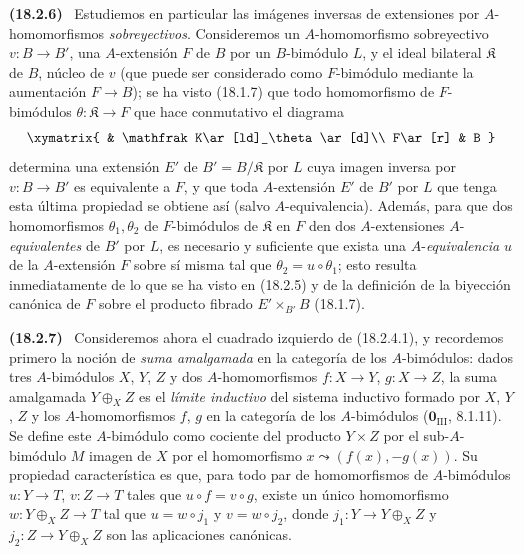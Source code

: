 \documentclass[10pt,oneside]{book}
\makeatletter
\newcommand{\setmanualcurrentlabel}[1]{\def\@currentlabel{#1}}
\newcommand{\oldpage}[2][]{%
  \setcounter{footnote}{0}%
  \marginpar{\scriptsize\textbf{#1}~|~#2}\ignorespaces}
\newenvironment{env}[1][]{\setmanualcurrentlabel{#1}\par\medskip\noindent\textbf{(#1)}\ }{\par}
\providecommand{\setmin}{-}%
\makeatother
\begin{document}
\begin{env}[18.2.6]
\label{0.18.2.6-es}
Estudiemos en particular las imágenes inversas de extensiones por
$A$-homomorfismos \emph{sobreyectivos}. Consideremos un $A$-homomorfismo
sobreyectivo $v:B\to B'$, una $A$-extensión $F$ de $B$ por un $B$-bimódulo $L$,
y el ideal bilateral $\mathfrak K$ de $B$, núcleo de $v$ (que puede ser
considerado como $F$-bimódulo mediante la aumentación $F\to B$); se ha visto
(18.1.7) que todo homomorfismo de $F$-bimódulos
$\theta:\mathfrak K\to F$ que hace conmutativo el diagrama
\[
  \xymatrix{
    & \mathfrak K\ar[ld]_\theta\ar[d]\\
    F\ar[r] & B
  }
\]
determina una extensión $E'$ de $B'=B/\mathfrak K$ por $L$ cuya imagen
inversa por $v:B\to B'$ es equivalente a $F$, y que toda $A$-extensión
$E'$ de $B'$ por $L$ que tenga esta última propiedad se obtiene así (salvo
$A$-equivalencia). Además, para que dos homomorfismos
$\theta_1,\theta_2$ de $F$-bimódulos de $\mathfrak K$ en $F$ den dos
  $A$-extensiones $A$-\emph{equivalentes} de $B'$ por $L$, es necesario y suficiente que
exista una $A$-\emph{equivalencia} $u$ de la $A$-extensión $F$ sobre sí misma tal que
\oldpage[0\textsubscript{IV-1}]{57}
$\theta_2=u\circ\theta_1$; esto resulta inmediatamente de lo que se ha visto en
(18.2.5) y de la definición de la biyección canónica de $F$ sobre el producto
fibrado $E'\times_{B'}B$ (18.1.7).
\end{env}

\begin{env}[18.2.7]
\label{0.18.2.7-es}
Consideremos ahora el cuadrado izquierdo de (18.2.4.1), y recordemos primero
la noción de \emph{suma amalgamada} en la categoría de los $A$-bimódulos:
dados tres $A$-bimódulos $X$, $Y$, $Z$ y dos $A$-homomorfismos
$f:X\to Y$, $g:X\to Z$, la suma amalgamada $Y\oplus_XZ$ es el \emph{límite
inductivo} del sistema inductivo formado por $X$, $Y$, $Z$ y los
$A$-homomorfismos $f$, $g$ en la categoría de los $A$-bimódulos
($\mathbf{0}_{\mathrm{III}}$, 8.1.11). Se define este $A$-bimódulo como cociente del
producto $Y\times Z$ por el sub-$A$-bimódulo $M$ imagen de $X$ por
el homomorfismo $x\leadsto(f(x),\setmin g(x))$. Su propiedad característica es que,
para todo par de homomorfismos de $A$-bimódulos $u:Y\to T$, $v:Z\to T$
tales que $u\circ f=v\circ g$, existe un único homomorfismo
$w:Y\oplus_XZ\to T$ tal que $u=w\circ j_1$ y $v=w\circ j_2$, donde
$j_1:Y\to Y\oplus_XZ$ y $j_2:Z\to Y\oplus_XZ$ son las aplicaciones
canónicas.
\end{env}
\end{document}
